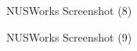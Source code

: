 \documentclass[fyp]{socreport}
\begin{document}
\begin{figure}
\caption{NUSWorks Screenshot (8)}
\label{screen-8}
\end{figure}

\begin{figure}
\caption{NUSWorks Screenshot (9)}
\label{screen-9}
\end{figure}
\end{document}

